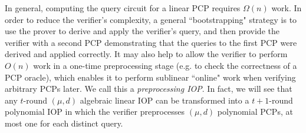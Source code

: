 In general, computing the query circuit for a linear PCP requires $\Omega(n)$ work. In order to reduce the verifier's complexity, a general ``bootstrapping" strategy is to use the prover to derive and apply the verifier's query, and then provide the verifier with a second PCP demonstrating that the queries to the first PCP were derived and applied correctly. It may also help to allow the verifier to perform $O(n)$ work in a one-time preprocessing stage (e.g. to check the correctness of a PCP oracle), which enables it to perform sublinear ``online" work when verifying arbitrary PCPs later. We call this a \emph{preprocessing IOP}. In fact, we will see that any $t$-round $(\mu, d)$ algebraic linear IOP can be transformed into a $t+1$-round polynomial IOP in which the verifier preprocesses $(\mu, d)$ polynomial PCPs, at most one for each distinct query. 





